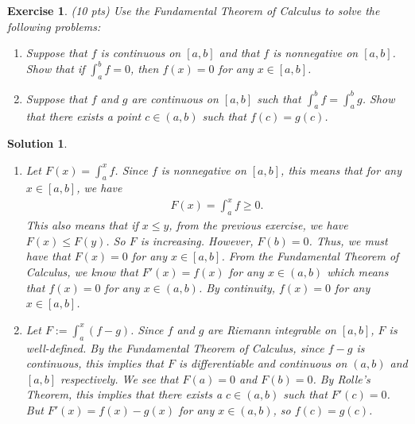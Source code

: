 \documentclass[12pt]{article}
\theoremstyle{plain}
\newtheorem{exer}{\textbf{Exercise}}}
\theoremstyle{plain}
\newtheorem*{sol}{\textbf{Solution}}}
\theoremstyle{plain}
\theoremstyle{plain}
\begin{document}
\begin{exer}
(10 pts)
Use the Fundamental Theorem of Calculus to solve the following problems:
	\begin{enumerate}[label=\textbf{\alph*)}]
	\item Suppose that $f$ is continuous on $[a, b]$ and that $f$ is nonnegative on $[a, b]$. Show that if $\int_a^b f = 0$, then $f(x) = 0$ for any $x \in [a, b]$.
	\item Suppose that $f$ and $g$ are continuous on $[a, b]$ such that $\int_a^b f = \int_a^b g$. Show that there exists a point $c \in (a, b)$ such that $f(c) = g(c)$.
	\end{enumerate}
\end{exer}
\begin{sol}
\begin{enumerate}
\item Let $F(x) = \int_a^x f$. Since $f$ is nonnegative on $[a, b]$, this means that for any $x \in [a, b]$, we have
	\begin{align*}
	F(x) = \int_a^x f \geq 0 .
	\end{align*}
This also means that if $x \leq y$, from the previous exercise, we have $F(x) \leq F(y)$. So $F$ is increasing. However, $F(b) = 0$. Thus, we must have that $F(x) = 0$ for any $x \in [a, b]$. From the Fundamental Theorem of Calculus, we know that $F'(x) = f(x)$ for any $x \in (a, b)$ which means that $f(x) = 0$ for any $x \in (a, b)$. By continuity, $f(x) = 0$ for any $x \in [a, b]$.
\item Let $F := \int_a^x (f - g)$. Since $f$ and $g$ are Riemann integrable on $[a, b]$, $F$ is well-defined. By the Fundamental Theorem of Calculus, since $f - g$ is continuous, this implies that $F$ is differentiable and continuous on $(a, b)$ and $[a, b]$ respectively. We see that $F(a) = 0$ and $F(b) = 0$. By Rolle's Theorem, this implies that there exists a $c \in (a, b)$ such that $F'(c) = 0$. But $F'(x) = f(x) - g(x)$ for any $x \in (a, b)$, so $f(c) = g(c)$.
\end{enumerate}
\end{sol}
\end{document}
